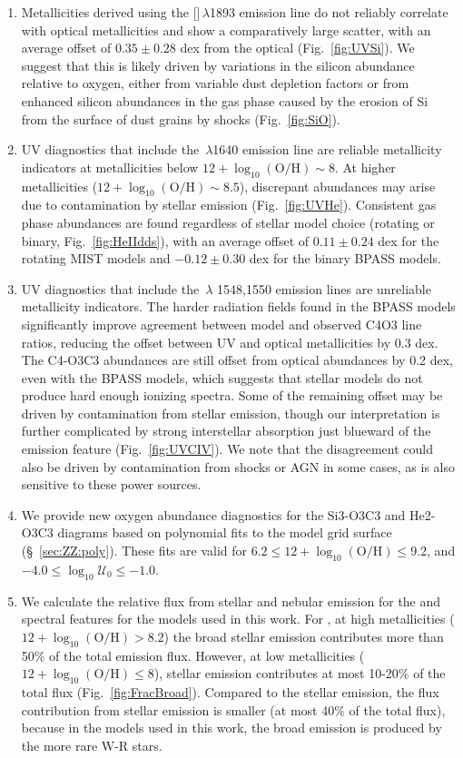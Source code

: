 \documentclass[trackchanges, preprint2]{aastex62}
\newcommand{\heii}{\ion{He}{2}}
\newcommand{\civ}{\ion{C}{4}}
\newcommand{\SiuIII}{[\ion{Si}{3}]}
\newcommand{\logten}{\ensuremath{\log_{10}}}
\newcommand{\logOH}{\ensuremath{\logten (\mathrm{O}/\mathrm{H})}\xspace}
\newcommand{\logU}{\ensuremath{\logten \mathcal{U}_0}}
\begin{document}
\begin{enumerate}
    \item Metallicities derived using the \SiuIII$\,\lambda$1893 emission line do not reliably correlate with optical metallicities and show a comparatively large scatter, with an average offset of $0.35 \pm 0.28$ dex from the optical (Fig.~\ref{fig:UVSi}). We suggest that this is likely driven by variations in the silicon abundance relative to oxygen, either from variable dust depletion factors or from enhanced silicon abundances in the gas phase caused by the erosion of Si from the surface of dust grains by shocks (Fig.~\ref{fig:SiO}).
    \item UV diagnostics that include the \heii$\,\lambda$1640 emission line are reliable metallicity indicators at metallicities below $12+\logOH \sim 8$. At higher metallicities ($12+\logOH \sim 8.5$), discrepant abundances may arise due to contamination by stellar \heii{} emission (Fig.~\ref{fig:UVHe}). Consistent gas phase abundances are found regardless of stellar model choice (rotating or binary, Fig.~\ref{fig:HeIIdds}), with an average offset of $0.11 \pm 0.24$ dex for the rotating MIST models and $-0.12 \pm 0.30$ dex for the binary BPASS models.
    \item UV diagnostics that include the \civ$\,\lambda$ 1548,1550 emission lines are unreliable metallicity indicators. The harder radiation fields found in the BPASS models significantly improve agreement between model and observed C4O3 line ratios, reducing the offset between UV and optical metallicities by 0.3 dex. The C4-O3C3 abundances are still offset from optical abundances by 0.2 dex, even with the BPASS models, which suggests that stellar models do not produce hard enough ionizing spectra. Some of the remaining offset may be driven by contamination from stellar emission, though our interpretation is further complicated by strong interstellar absorption just blueward of the emission feature (Fig.~\ref{fig:UVCIV}). We note that the disagreement could also be driven by contamination from shocks or AGN in some cases, as \civ{} is also sensitive to these power sources. 
    \item We provide new oxygen abundance diagnostics for the Si3-O3C3 and He2-O3C3 diagrams based on polynomial fits to the model grid surface (\S~\ref{sec:ZZ:poly}). These fits are valid for $6.2 \leq 12+\logOH \leq 9.2$, and $-4.0 \leq \logU \leq -1.0$.
    \item We calculate the relative flux from stellar and nebular emission for the \heii{} and \civ{} spectral features for the models used in this work. For \civ{}, at high metallicities ($12+\logOH>8.2$) the broad stellar emission contributes more than 50\% of the total emission flux. However, at low metallicities ($12+\logOH\leq8$), stellar emission contributes at most 10-20\% of the total \civ{} flux (Fig.~\ref{fig:FracBroad}). Compared to the stellar \civ{} emission, the flux contribution from stellar \heii{} emission is smaller (at most 40\% of the total flux), because in the models used in this work, the broad \heii{} emission is produced by the more rare W-R stars.

\end{enumerate}
\end{document}
